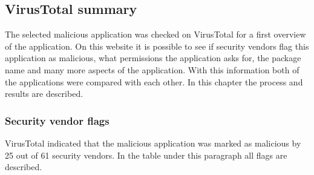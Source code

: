 \subsection{VirusTotal summary}
The selected malicious application was checked on VirusTotal for a first overview of the application.
On this website it is possible to see if security vendors flag this application as malicious, what permissions the application asks for, the package name and many more aspects of the application.
With this information both of the applications were compared with each other.
In this chapter the process and results are described.

\subsubsection{Security vendor flags}
VirusTotal indicated that the malicious application was marked as malicious by 25 out of 61 security vendors.
In the table under this paragraph all flags are described.

